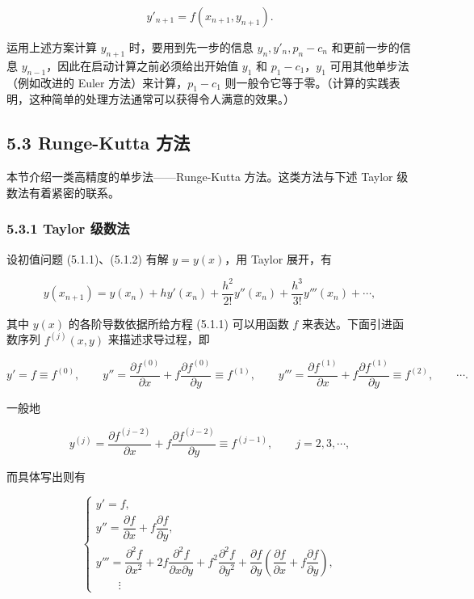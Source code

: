 \documentclass[
  10pt,
  fontset=fandol]{ctexart}
\begin{document}
\[
y'_{n+1}=f(x_{n+1},y_{n+1}).
\]

运用上述方案计算 \(y_{n+1}\) 时，要用到先一步的信息 \(y_n,y'_n,p_n-c_n\) 和更前一步的信息 \(y_{n-1}\)，因此在启动计算之前必须给出开始值 \(y_1\) 和 \(p_1-c_1\)，\(y_1\) 可用其他单步法（例如改进的 Euler 方法）来计算，\(p_1-c_1\) 则一般令它等于零。（计算的实践表明，这种简单的处理方法通常可以获得令人满意的效果。）

\subsection{5.3 Runge-Kutta 方法}\label{runge-kutta-ux65b9ux6cd5}

本节介绍一类高精度的单步法------Runge-Kutta 方法。这类方法与下述 Taylor 级数法有着紧密的联系。

\subsubsection{5.3.1 Taylor 级数法}\label{taylor-ux7ea7ux6570ux6cd5}

设初值问题 (5.1.1)、(5.1.2) 有解 \(y=y(x)\)，用 Taylor 展开，有

\[
y(x_{n+1})=y(x_n)+hy'(x_n)+\frac{h^2}{2!}y''(x_n)+\frac{h^3}{3!}y'''(x_n)+\cdots,\tag{5.3.1}
\]

其中 \(y(x)\) 的各阶导数依据所给方程 (5.1.1) 可以用函数 \(f\) 来表达。下面引进函数序列 \(f^{(j)}(x,y)\) 来描述求导过程，即

\[
y'=f\equiv f^{(0)},\qquad
y''=\frac{\partial f^{(0)}}{\partial x}+f\frac{\partial f^{(0)}}{\partial y}\equiv f^{(1)},\qquad
y'''=\frac{\partial f^{(1)}}{\partial x}+f\frac{\partial f^{(1)}}{\partial y}\equiv f^{(2)},\qquad\cdots.
\]

一般地

\[
y^{(j)}=\frac{\partial f^{(j-2)}}{\partial x}+f\frac{\partial f^{(j-2)}}{\partial y}\equiv f^{(j-1)},\qquad j=2,3,\cdots,
\]

而具体写出则有

\[
\begin{cases}
y'=f,\\
y''=\dfrac{\partial f}{\partial x}+f\dfrac{\partial f}{\partial y},\\
y'''=\dfrac{\partial^2f}{\partial x^2}+2f\dfrac{\partial^2f}{\partial x\partial y}
+f^2\dfrac{\partial^2f}{\partial y^2}
+\dfrac{\partial f}{\partial y}\left(\dfrac{\partial f}{\partial x}+f\dfrac{\partial f}{\partial y}\right),\\
\qquad\vdots
\end{cases}\tag{5.3.2}
\]
\end{document}
